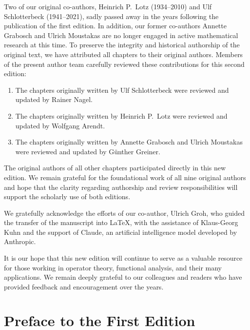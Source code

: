 Two of our original co-authors, Heinrich P.~Lotz (1934--2010) and Ulf Schlotterbeck (1941--2021), sadly passed away in the years following the publication of the first edition. 
In addition, our former co-authors Annette Grabosch and Ulrich Moustakas are no longer engaged in active mathematical research at this time. 
To preserve the integrity and historical authorship of the original text, we have attributed all chapters to their original authors. 
Members of the present author team carefully reviewed these contributions for this second edition:
\begin{enumerate}[$\bullet$, wide, labelindent=.25em,itemsep=.25em]
\item 
The chapters originally written by Ulf Schlotterbeck were reviewed and updated by Rainer Nagel.

\item 
The chapters originally written by Heinrich P.~Lotz were reviewed and updated by Wolfgang Arendt.

\item 
The chapters originally written by Annette Grabosch and Ulrich Moustakas were reviewed and updated by G\"unther Greiner.

\end{enumerate}
The original authors of all other chapters participated directly in this new edition. 
We remain grateful for the foundational work of all nine original authors and hope that the clarity regarding authorship and review responsibilities will support the scholarly use of both editions.

We gratefully acknowledge the efforts of our co-author, Ulrich Groh, who guided the transfer of the manuscript into \LaTeX{}, with the assistance of Klaus-Georg Kuhn and the support of Claude, an artificial intelligence model developed by Anthropic.



It is our hope that this new edition will continue to serve as a valuable resource for those working in operator theory, functional analysis, and their many applications. We remain deeply grateful to our colleagues and readers who have provided feedback and encouragement over the years.

\section*{Preface to the First Edition}
 
